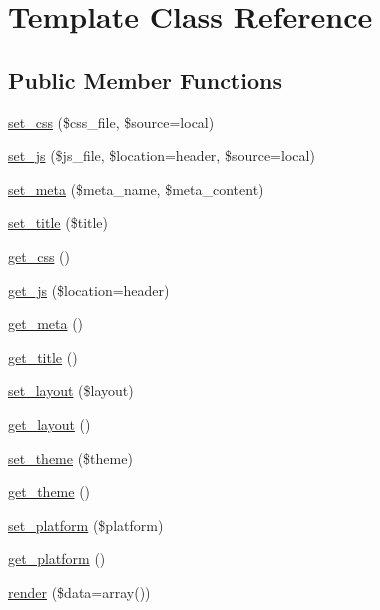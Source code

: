 \hypertarget{class_template}{}\section{Template Class Reference}
\label{class_template}
\subsection*{Public Member Functions}
\begin{DoxyCompactItemize}
\item 
\mbox{\hyperlink{class_template_a2d9a6541579ccdb6e3836b0d26fb0b16}{set\+\_\+css}} (\$css\+\_\+file, \$source=\textquotesingle{}local\textquotesingle{})
\item 
\mbox{\hyperlink{class_template_a332b8624a847037332a8dce494add20c}{set\+\_\+js}} (\$js\+\_\+file, \$location=\textquotesingle{}header\textquotesingle{}, \$source=\textquotesingle{}local\textquotesingle{})
\item 
\mbox{\hyperlink{class_template_a8808eee4df738b9e726281967f1e90b7}{set\+\_\+meta}} (\$meta\+\_\+name, \$meta\+\_\+content)
\item 
\mbox{\hyperlink{class_template_a77fbf5b705d3f0142f8ba77f8364cf45}{set\+\_\+title}} (\$title)
\item 
\mbox{\hyperlink{class_template_a704742c49a6f5c1546998619d37188cb}{get\+\_\+css}} ()
\item 
\mbox{\hyperlink{class_template_a42620c35787667d0a7fbda7473886ccf}{get\+\_\+js}} (\$location=\textquotesingle{}header\textquotesingle{})
\item 
\mbox{\hyperlink{class_template_a83ddce330490a956720d8c3d6bf97372}{get\+\_\+meta}} ()
\item 
\mbox{\hyperlink{class_template_ac01f0421cdf853d8bdac45fcd181dc28}{get\+\_\+title}} ()
\item 
\mbox{\hyperlink{class_template_aa3828685c168ff32149bbe1b5f94e671}{set\+\_\+layout}} (\$layout)
\item 
\mbox{\hyperlink{class_template_ab914fc6f8744c64a352cc6a0279e91c7}{get\+\_\+layout}} ()
\item 
\mbox{\hyperlink{class_template_a51757f768d2afcaa9bc6013adf7d952a}{set\+\_\+theme}} (\$theme)
\item 
\mbox{\hyperlink{class_template_ac5245cd48efa7a670263a0b11493bb70}{get\+\_\+theme}} ()
\item 
\mbox{\hyperlink{class_template_aac02489372aef6eb2e074c8c2123ecd5}{set\+\_\+platform}} (\$platform)
\item 
\mbox{\hyperlink{class_template_af16eb38a172fb6712effb2dfffdac0ba}{get\+\_\+platform}} ()
\item 
\mbox{\hyperlink{class_template_a119fec25d9d429f9b9b467f7f67f039b}{render}} (\$data=array())
\end{DoxyCompactItemize}
